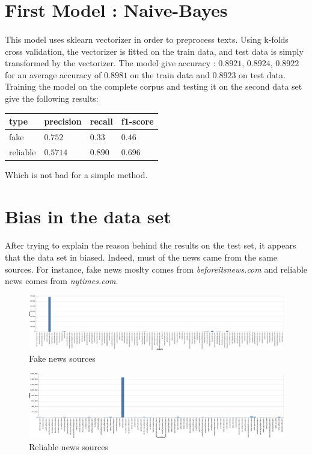 \documentclass[11pt,a4paper,oneside]{report}
\begin{document}
\section{First Model : Naive-Bayes}
\paragraph{} This model uses sklearn vectorizer in order to preprocess texts. Using k-folds cross validation, the vectorizer is fitted on the train data, and test data is simply transformed by the vectorizer. The model give accuracy : $0.8921$, $0.8924$, $0.8922$ for an average accuracy of $0.8981$ on the train data and $0.8923$ on test data. Training the model on the complete corpus and testing it on the second data set give the following results: 
\begin{table}[h]
\centering
\begin{tabular}{|l|l|l|l|}
\hline
 type & precision & recall & f1-score \\
 \hline
 fake & $0.752$ &  $0.33$ & $0.46$   \\
 reliable & $0.5714$  &  $0.890$ &  $0.696$ \\
 \hline
\end{tabular}
\end{table}
Which is not bad for a simple method. 

\section{Bias in the data set}
\paragraph{} After trying to explain the reason behind the results on the test set, it appears that the data set in biased. Indeed, must of the news came from the same sources. For instance, fake news moslty comes from \textit{beforeitsnews.com} and reliable news comes from \textit{nytimes.com}.
\begin{figure}[h]
	\centering
	\includegraphics[width=1\textwidth]{fake.pdf}
	\caption{Fake news sources}
\end{figure}
\begin{figure}[h]
	\centering
	\includegraphics[width=1\textwidth]{reliable.pdf}
	\caption{Reliable news sources}
\end{figure}
\end{document}
